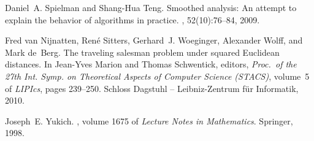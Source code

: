 \documentclass[11pt,DIV=12,a4paper]{scrartcl}
\begin{document}
\begin{thebibliography}{10}
Daniel~A. Spielman and Shang-Hua Teng.
\newblock Smoothed analysis: An attempt to explain the behavior of algorithms
  in practice.
, 52(10):76--84, 2009.

Fred van Nijnatten, Ren{\'e} Sitters, Gerhard~J. Woeginger, Alexander Wolff,
  and Mark de~Berg.
\newblock The traveling salesman problem under squared {E}uclidean distances.
\newblock In Jean-Yves Marion and Thomas Schwentick, editors, {\em Proc.\ of
  the 27th Int. Symp. on Theoretical Aspects of Computer Science (STACS)},
  volume~5 of {\em LIPIcs}, pages 239--250. Schloss Dagstuhl -- Leibniz-Zentrum
  f\"ur Informatik, 2010.

Joseph~E. Yukich.
, volume 1675 of {\em Lecture Notes in Mathematics}.
\newblock Springer, 1998.

\end{thebibliography}
%
%
\end{document}
